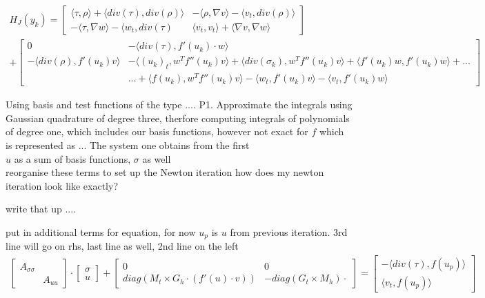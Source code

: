 \documentclass[../draft_1.tex]{subfiles}
\begin{document}
\begin{equation}
\begin{aligned}
H_J(y_k) = \begin{bmatrix}
\langle \tau, \rho \rangle + \langle div(\tau), div(\rho) \rangle & - \langle \rho, \nabla v \rangle - \langle v_t, div(\rho) \rangle  \\
- \langle \tau, \nabla w \rangle - \langle w_t, div(\tau)& \langle v_t, v_t \rangle + \langle \nabla v, \nabla w \rangle 
\end{bmatrix} \\
+ \begin{bmatrix}
0 & - \langle div(\tau), f'(u_k) \cdot w \rangle \\
- \langle div(\rho), f'(u_k) v \rangle & -\langle (u_k)_t, w^T f''(u_k) v \rangle + \langle div(\sigma_k), w^T f''(u_k) v \rangle + \langle f'(u_k)w , f'(u_k) w \rangle +... \\ &... + \langle f(u_k), w^T f''(u_k) v \rangle - \langle w_t, f'(u_k) v \rangle - \langle v_t, f'(u_k) w \rangle
\end{bmatrix}
\end{aligned}
\end{equation}

Using basis and test functions of the type .... P1. Approximate the integrals using Gaussian quadrature of degree three, therfore computing integrals of polynomials of degree one, which includes our basis functions, however not exact for $f$ which is represented as ... 
The system one obtains from the first \\
$u$ as a sum of basis functions, $\sigma$ as well \\


reorganise these terms to set up the Newton iteration  
how does my newton iteration look like exactly? 

write that up ....


put in additional terms for equation, for now $u_p$ is $u$ from previous iteration. 3rd line will go on rhs, last line as well, 2nd line on the left
\begin{align*}
\begin{bmatrix}
A_{\sigma \sigma} &  \\
& A_{uu}
\end{bmatrix} \cdot
\begin{bmatrix}
\sigma \\
u
\end{bmatrix} + 
\begin{bmatrix}
0 & 0 \\
diag(M_t \times G_h \cdot (f'(u) \cdot v)) & - diag(G_t \times M_h) \cdot 
\end{bmatrix}
= 
\begin{bmatrix}
- \langle div(\tau), f(u_p) \rangle \\
\langle v_t, f(u_p) \rangle 
\end{bmatrix}
\end{align*}
\end{document}
